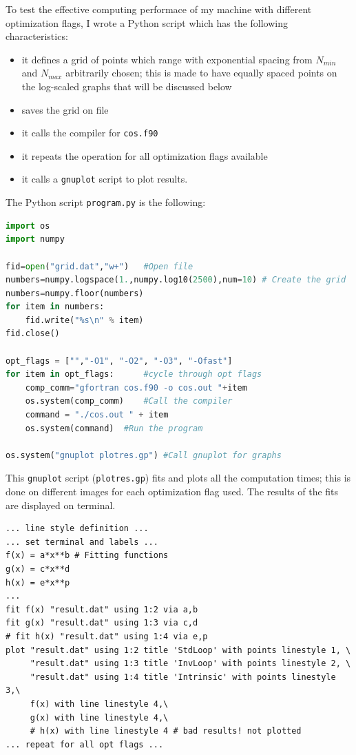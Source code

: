 \documentclass[a4paper]{article}
\begin{document}
\noindent To test the effective computing performace of my machine with different optimization flags, I wrote a Python script which has the following characteristics:
\begin{itemize}
    \item it defines a grid of points which range with exponential spacing from $N_{min}$ and $N_{max}$ arbitrarily chosen; this is made to have equally spaced points on the log-scaled graphs that will be discussed below
    \item saves the grid on file
    \item it calls the compiler for \lstinline{cos.f90}
    \item it repeats the operation for all optimization flags available
    \item it calls a \lstinline{gnuplot} script to plot results.
\end{itemize}
The Python script \lstinline[language=python]{program.py} is the following:
\begin{lstlisting}[language=python]
import os
import numpy

fid=open("grid.dat","w+")   #Open file
numbers=numpy.logspace(1.,numpy.log10(2500),num=10) # Create the grid
numbers=numpy.floor(numbers)
for item in numbers:
    fid.write("%s\n" % item)
fid.close()

opt_flags = ["","-O1", "-O2", "-O3", "-Ofast"]
for item in opt_flags:      #cycle through opt flags
    comp_comm="gfortran cos.f90 -o cos.out "+item 
    os.system(comp_comm)    #Call the compiler
    command = "./cos.out " + item
    os.system(command)  #Run the program

os.system("gnuplot plotres.gp") #Call gnuplot for graphs


\end{lstlisting}
This \lstinline{gnuplot} script (\lstinline{plotres.gp}) fits and plots all the computation times; this is done on different images for each optimization flag used.
The results of the fits are displayed on terminal. 
\begin{verbatim}
... line style definition ...
... set terminal and labels ...
f(x) = a*x**b # Fitting functions
g(x) = c*x**d
h(x) = e*x**p
...
fit f(x) "result.dat" using 1:2 via a,b
fit g(x) "result.dat" using 1:3 via c,d
# fit h(x) "result.dat" using 1:4 via e,p
plot "result.dat" using 1:2 title 'StdLoop' with points linestyle 1, \
     "result.dat" using 1:3 title 'InvLoop' with points linestyle 2, \
     "result.dat" using 1:4 title 'Intrinsic' with points linestyle 3,\
     f(x) with line linestyle 4,\
     g(x) with line linestyle 4,\
     # h(x) with line linestyle 4 # bad results! not plotted
... repeat for all opt flags ...
\end{verbatim}
\end{document}
